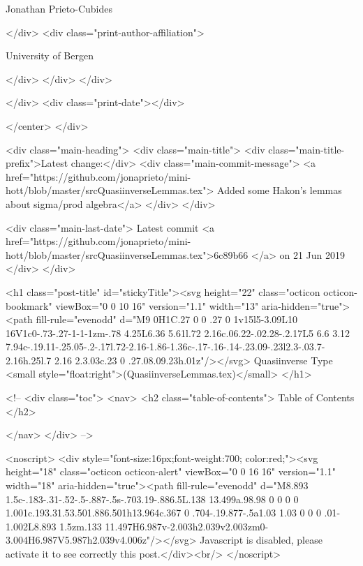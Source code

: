                   Jonathan Prieto-Cubides
                
              </div>
              <div class="print-author-affiliation">
                
                  University of Bergen
                
                </div>
            </div>
          </div>
          
          
        </div>
        <div class="print-date"></div>
        
        
    </center>
  </div>

  
  <div class="main-heading">
    <div class="main-title">
      <div class="main-title-prefix">Latest change:</div>
      <div class="main-commit-message">
            <a href="https://github.com/jonaprieto/mini-hott/blob/master/srcQuasiinverseLemmas.tex">
              Added some Hakon's lemmas about sigma/prod algebra</a>
      </div>
    </div>

    <div class="main-last-date">
      Latest commit <a href="https://github.com/jonaprieto/mini-hott/blob/master/srcQuasiinverseLemmas.tex">6c89b66 </a> on  21 Jun 2019
    </div>
  </div>
  

  <h1 class="post-title" id="stickyTitle"><svg height="22" class="octicon octicon-bookmark" viewBox="0 0 10 16" version="1.1" width="13" aria-hidden="true"><path fill-rule="evenodd" d="M9 0H1C.27 0 0 .27 0 1v15l5-3.09L10 16V1c0-.73-.27-1-1-1zm-.78 4.25L6.36 5.61l.72 2.16c.06.22-.02.28-.2.17L5 6.6 3.12 7.94c-.19.11-.25.05-.2-.17l.72-2.16-1.86-1.36c-.17-.16-.14-.23.09-.23l2.3-.03.7-2.16h.25l.7 2.16 2.3.03c.23 0 .27.08.09.23h.01z"/></svg> Quasiinverse Type <small style="float:right">(QuasiinverseLemmas.tex)</small>
  </h1>

  <!-- 
  <div class="toc">
    <nav>
    <h2 class="table-of-contents"> Table of Contents </h2>
      

    </nav>
  </div>
   -->

  <noscript>
  <div style="font-size:16px;font-weight:700; color:red;"><svg height="18" class="octicon octicon-alert" viewBox="0 0 16 16" version="1.1" width="18" aria-hidden="true"><path fill-rule="evenodd" d="M8.893 1.5c-.183-.31-.52-.5-.887-.5s-.703.19-.886.5L.138 13.499a.98.98 0 0 0 0 1.001c.193.31.53.501.886.501h13.964c.367 0 .704-.19.877-.5a1.03 1.03 0 0 0 .01-1.002L8.893 1.5zm.133 11.497H6.987v-2.003h2.039v2.003zm0-3.004H6.987V5.987h2.039v4.006z"/></svg> Javascript is disabled, please activate it to see correctly this post.</div><br/>
  </noscript>

